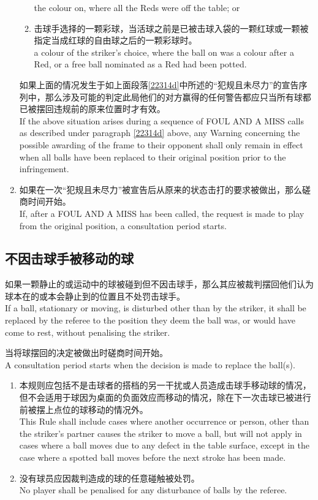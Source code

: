 \begin{enumerate}[label=(\alph*)]
\begin{enumerate}[label=(\roman*)]
        the colour on, where all the Reds were off the table; or
        \item 击球手选择的一颗彩球，当活球之前是已被击球入袋的一颗红球或一颗被指定当成红球的自由球之后的一颗彩球时。\\
        a colour of the striker's choice, where the ball on was a colour after a Red, or a free ball nominated as a Red had been potted.
    \end{enumerate}
    如果上面的情况发生于如上面段落\ref{22314d}中所述的``犯规且未尽力''的宣告序列中，那么涉及可能的判定此局他们的对方赢得的任何警告都应只当所有球都已被摆回违规前的原来位置时才有效。\\
    If the above situation arises during a sequence of FOUL AND A MISS calls as described under paragraph \ref{22314d} above, any Warning concerning the possible awarding of the frame to their opponent shall only remain in effect when all balls have been replaced to their original position prior to the infringement.
    \item 如果在一次``犯规且未尽力''被宣告后从原来的状态击打的要求被做出，那么磋商时间开始。\\
    If, after a FOUL AND A MISS has been called, the request is made to play from the original position, a consultation period starts.
\end{enumerate}

\subsection{不因击球手被移动的球}\label{22315}

\noindent 如果一颗静止的或运动中的球被碰到但不因击球手，那么其应被裁判摆回他们认为球本在的或本会静止到的位置且不处罚击球手。\\
If a ball, stationary or moving, is disturbed other than by 
the striker, it shall be replaced by the referee to the position 
they deem the ball was, or would have come to rest, without 
penalising the striker.

\noindent 当将球摆回的决定被做出时磋商时间开始。\\
A consultation period starts when the decision is made to replace the ball(s).
\begin{enumerate}[label=(\alph*)]
    \item 本规则应包括不是击球者的搭档的另一干扰或人员造成击球手移动球的情况，但不会适用于球因为桌面的负面效应而移动的情况，除在下一次击球已被进行前被摆上点位的球移动的情况外。\\
    This Rule shall include cases where another occurrence or person, other than the striker's partner causes the striker to move a ball, but will not apply in cases where a ball moves due to any defect in the table surface, except in the case where a spotted ball moves before the next stroke has been made.
    \item 没有球员应因裁判造成的球的任意碰触被处罚。\\
    No player shall be penalised for any disturbance of balls by the referee.
\end{enumerate}

